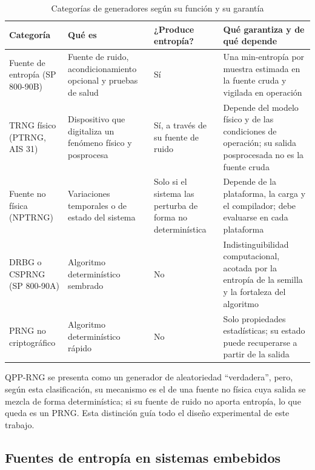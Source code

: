 \begin{table}[htbp]
\centering
\caption{Categorías de generadores según su función y su garantía}
\label{tab:categorias_rng}
\small
\begin{tabularx}{\textwidth}{@{}L{0.17\textwidth}L{0.22\textwidth}L{0.15\textwidth}Y@{}}
\toprule
\textbf{Categoría} & \textbf{Qué es} & \textbf{¿Produce entropía?} & \textbf{Qué garantiza y de qué depende} \\
\midrule
Fuente de entropía (SP 800-90B) & Fuente de ruido, acondicionamiento opcional y pruebas de salud & Sí & Una min-entropía por muestra estimada en la fuente cruda y vigilada en operación \\
TRNG físico (PTRNG, AIS 31) & Dispositivo que digitaliza un fenómeno físico y posprocesa & Sí, a través de su fuente de ruido & Depende del modelo físico y de las condiciones de operación; su salida posprocesada no es la fuente cruda \\
Fuente no física (NPTRNG) & Variaciones temporales o de estado del sistema & Solo si el sistema las perturba de forma no determinística & Depende de la plataforma, la carga y el compilador; debe evaluarse en cada plataforma \\
DRBG o CSPRNG (SP 800-90A) & Algoritmo determinístico sembrado & No & Indistinguibilidad computacional, acotada por la entropía de la semilla y la fortaleza del algoritmo \\
PRNG no criptográfico & Algoritmo determinístico rápido & No & Solo propiedades estadísticas; su estado puede recuperarse a partir de la salida \\
\bottomrule
\end{tabularx}
\end{table}

QPP-RNG se presenta como un generador de aleatoriedad ``verdadera'', pero, según esta clasificación, su mecanismo es el de una fuente no física cuya salida se mezcla de forma determinística; si su fuente de ruido no aporta entropía, lo que queda es un PRNG. Esta distinción guía todo el diseño experimental de este trabajo.

\subsection{Fuentes de entropía en sistemas embebidos}
\label{sec:fuentes_embebidas}


